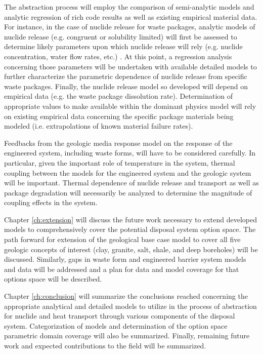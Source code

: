The abstraction process will employ the comparison of semi-analytic 
models and
analytic regression of rich code results as well as existing empirical 
material
data. For instance, in the case of nuclide release for waste packages, 
analytic
models of nuclide release (e.g. congruent or solubility limited) will 
first be
assessed to determine likely parameters upon which nuclide release 
will rely
(e.g. nuclide concentration, water flow rates, etc.) 
\cite{ahn_congruent}. At
this point, a regression analysis concerning those parameters will be
undertaken with available detailed models to further characterize the
parametric dependence of nuclide release from specific waste packages.
Finally, the nuclide release model so developed will depend on 
empirical data
(e.g. the waste package dissolution rate). Determination of 
appropriate values
to make available within the dominant physics model will rely on 
existing
empirical data concerning the specific package materials being modeled 
(i.e.
extrapolations of known material failure rates).  

Feedbacks from the geologic media response model on the response of 
the
engineered system, including waste forms, will have to be considered 
carefully.
In particular, given the important role of temperature in the system, 
thermal
coupling between the models for the engineered system and the geologic 
system
will be important. Thermal dependence of nuclide release and transport 
as well
as package degradation will necessarily be analyzed to determine the 
magnitude
of coupling effects in the system.

Chapter \ref{ch:extension} will discuss the future work necessary to 
extend
developed models to comprehensively cover the potential disposal 
system option
space. The path forward for extension of the geological base case 
model to
cover all five geologic concepts of interest (clay, granite, salt, 
shale, and
deep boreholes) will be discussed. Similarly, gaps in waste form and 
engineered
barrier system models and data will be addressed and a plan for data 
and model
coverage for that options space will be described.

Chapter \ref{ch:conclusion} will summarize the conclusions reached 
concerning
the appropriate analytical and detailed models to utilize in the 
process of
abstraction for nuclide and heat transport through various components 
of the
disposal system. Categorization of models and determination of the 
option space
parametric domain coverage will also be summarized. Finally, remaining 
future
work and expected contributions to the field will be summarized. 
